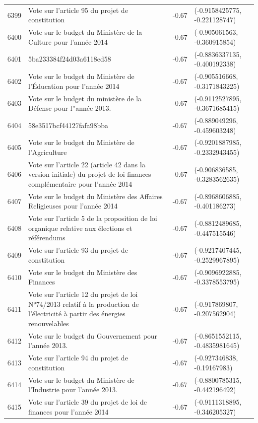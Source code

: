 \begin{table}[ht]
\begin{tabular}{rlrl}
  6399 & Vote sur l'article 95 du projet de constitution & -0.67 & (-0.9158425775, -0.221128747) \\ 
  6400 & Vote sur le budget du Ministère de la Culture pour l'année 2014 & -0.67 & (-0.905061563, -0.360915854) \\ 
  6401 & 5ba233384f24d03a6118ed58 & -0.67 & (-0.8836337135, -0.400192338) \\ 
  6402 & Vote sur le budget du Ministère de l'Éducation pour l'année 2014 & -0.67 & (-0.905516668, -0.3171843225) \\ 
  6403 & Vote sur le budget du ministère de la Défense pour l''année 2013. & -0.67 & (-0.9112527895, -0.3671685415) \\ 
  6404 & 58e3517bcf44127fafa98bba & -0.67 & (-0.889049296, -0.459603248) \\ 
  6405 & Vote sur le budget du Ministère de l'Agriculture & -0.67 & (-0.9201887985, -0.2332943455) \\ 
  6406 & Vote sur l'article 22 (article 42 dans la version initiale) du projet de loi finances complémentaire pour l'année 2014 & -0.67 & (-0.906836585, -0.3283562635) \\ 
  6407 & Vote sur le budget du Ministère des Affaires Religieuses pour l'année 2014 & -0.67 & (-0.8968606885, -0.401186273) \\ 
  6408 & Vote sur l'article 5 de la proposition de loi organique relative aux élections et référendums & -0.67 & (-0.8812489685, -0.447515546) \\ 
  6409 & Vote sur l'article 93 du projet de constitution & -0.67 & (-0.9217407445, -0.2529967895) \\ 
  6410 & Vote sur le budget du Ministère des Finances & -0.67 & (-0.9096922885, -0.3378553795) \\ 
  6411 & Vote sur l'article 12 du projet de loi N°74/2013 relatif à la production de l'électricité à partir des énergies renouvelables & -0.67 & (-0.917869807, -0.207562904) \\ 
  6412 & Vote sur le budget du Gouvernement pour l'année 2013. & -0.67 & (-0.8651552115, -0.4835981645) \\ 
  6413 & Vote sur l'article 94 du projet de constitution & -0.67 & (-0.927346838, -0.19167983) \\ 
  6414 & Vote sur le budget du Ministère de l’Industrie pour l'année 2013. & -0.67 & (-0.8800785315, -0.442196492) \\ 
  6415 & Vote sur l'article 39 du projet de loi de finances pour l'année 2014 & -0.67 & (-0.9111318895, -0.346205327) \\ 

\end{tabular}
\end{table}
